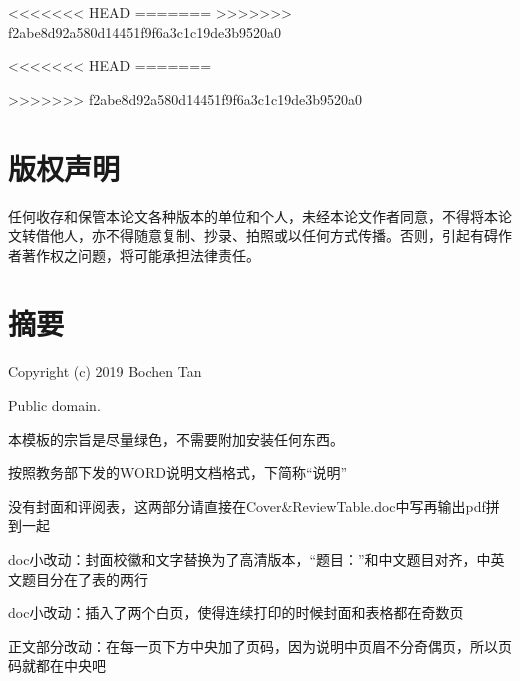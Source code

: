 \documentclass[UTF8,openany,AutoFakeBold,AutoFakeSlant,cs4size]{ctexbook}
\title{}
\author{}
\date{}
\begin{document}
<<<<<<< HEAD
\newcommand{\chineseTitle}{中文题目title楷体，二号，加粗}
=======
\newcommand{\chineseTitle}{中文题目（kaiti，二号，加粗）}
>>>>>>> f2abe8d92a580d14451f9f6a3c1c19de3b9520a0
\newcommand{\englishTitle}{英文题目（Times New Roman，三号，加粗）}
\newcommand{\name}{张三}
\newcommand{\studentID}{15000xxxxx}
\newcommand{\school}{信息科学技术学院}
\newcommand{\major}{电子信息科学与技术}
\newcommand{\advisor}{李四}

\clearpage



\clearpage

<<<<<<< HEAD
\songti\linespread{1.5}\selectfont
\linespread{1.5}\selectfont
=======

\songti\linespread{1.5}\selectfont
>>>>>>> f2abe8d92a580d14451f9f6a3c1c19de3b9520a0
\chapter*{版权声明}
\setcounter{page}{0}
\thispagestyle{empty}
任何收存和保管本论文各种版本的单位和个人，未经本论文作者同意，不得将本论文转借他人，亦不得随意复制、抄录、拍照或以任何方式传播。否则，引起有碍作者著作权之问题，将可能承担法律责任。
\clearpage

\quad
\setcounter{page}{0}
\thispagestyle{empty}
\clearpage



\pagestyle{fancy}
\normalsize
\linespread{1.5}\selectfont
\chapter*{摘要}
Copyright (c) 2019 Bochen Tan

Public domain.

本模板的宗旨是尽量绿色，不需要附加安装任何东西。

按照教务部下发的WORD说明文档格式，下简称“说明”

没有封面和评阅表，这两部分请直接在Cover\&ReviewTable.doc中写再输出pdf拼到一起

doc小改动：封面校徽和文字替换为了高清版本，“题目：”和中文题目对齐，中英文题目分在了表的两行

doc小改动：插入了两个白页，使得连续打印的时候封面和表格都在奇数页

正文部分改动：在每一页下方中央加了页码，因为说明中页眉不分奇偶页，所以页码就都在中央吧
\end{document}
